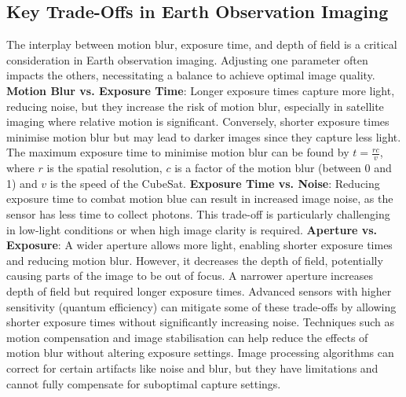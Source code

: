 \documentclass[10pt]{article}
\begin{document}
\begin{multicols}{2}
\subsection{Key Trade-Offs in Earth Observation Imaging}
The interplay between motion blur, exposure time, and depth of field is a critical consideration in Earth observation imaging. Adjusting one parameter often impacts the others, necessitating a balance to achieve optimal image quality.
\newline \newline
\textbf{Motion Blur vs. Exposure Time}: Longer exposure times capture more light, reducing noise, but they increase the risk of motion blur, especially in satellite imaging where relative motion is significant. Conversely, shorter exposure times minimise motion blur but may lead to darker images since they capture less light. The maximum exposure time to minimise motion blur can be found by \(t=\frac{rc}{v}\), where $r$ is the spatial resolution, $c$ is a factor of the motion blur (between 0 and 1) and $v$ is the speed of the CubeSat.
\newline \newline
\textbf{Exposure Time vs. Noise}: Reducing exposure time to combat motion blue can result in increased image noise, as the sensor has less time to collect photons. This trade-off is particularly challenging in low-light conditions or when high image clarity is required.
\newline \newline
\textbf{Aperture vs. Exposure}: A wider aperture allows more light, enabling shorter exposure times and reducing motion blur. However, it decreases the depth of field, potentially causing parts of the image to be out of focus. A narrower aperture increases depth of field but required longer exposure times.
\newline \newline
Advanced sensors with higher sensitivity (quantum efficiency) can mitigate some of these trade-offs by allowing shorter exposure times without significantly increasing noise. Techniques such as motion compensation and image stabilisation can help reduce the effects of motion blur without altering exposure settings. Image processing algorithms can correct for certain artifacts like noise and blur, but they have limitations and cannot fully compensate for suboptimal capture settings.


\end{multicols}
\end{document}
